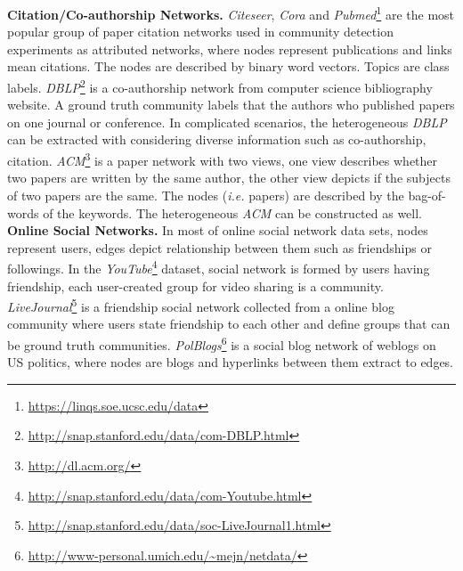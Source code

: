 \textbf{Citation/Co-authorship Networks.}
\textit{Citeseer}, \textit{Cora} and \textit{Pubmed}\footnote{\url{https://linqs.soe.ucsc.edu/data}} are the most popular group of paper citation networks used in community detection experiments as attributed networks, where nodes represent publications and links mean citations. The nodes are described by binary word vectors. Topics are class labels. 
\textit{DBLP}\footnote{\url{http://snap.stanford.edu/data/com-DBLP.html}} is a co-authorship network from computer science bibliography website. A ground truth community labels that the authors who published papers on one journal or conference. In complicated scenarios, the heterogeneous \textit{DBLP} can be extracted with considering diverse information such as co-authorship, citation.
\textit{ACM}\footnote{\url{http://dl.acm.org/}} is a paper network with two views, one view describes whether two papers are written by the same author, the other view depicts if the subjects of two papers are the same. The nodes (\textit{i.e.} papers) are described by the bag-of-words of the keywords. The heterogeneous \textit{ACM} can be constructed as well.
\textbf{Online Social Networks.}
In most of online social network data sets, nodes represent users, edges depict relationship between them such as friendships or followings. In the \textit{YouTube}\footnote{\url{http://snap.stanford.edu/data/com-Youtube.html}} dataset, social network is formed by users having friendship, each user-created group for video sharing is a community. \textit{LiveJournal}\footnote{\url{http://snap.stanford.edu/data/soc-LiveJournal1.html}} is a friendship social network collected from a online blog community where users state friendship to each other and define groups that can be ground truth communities. \textit{PolBlogs}\footnote{\url{http://www-personal.umich.edu/~mejn/netdata/}\label{newman}} is a social blog network of weblogs on US politics, where nodes are blogs and hyperlinks between them extract to edges. 
